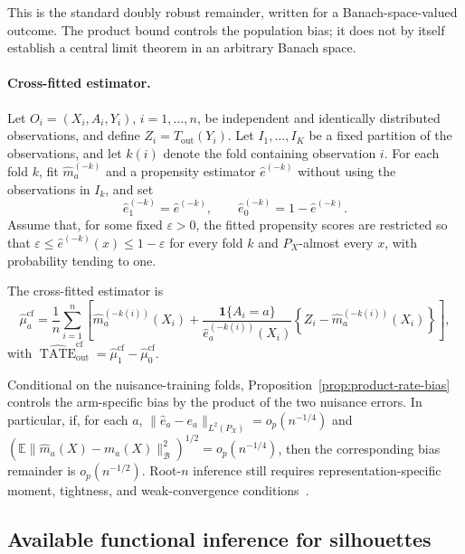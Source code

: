 \documentclass[11pt,a4paper]{article}
\theoremstyle{plain}
\theoremstyle{definition}
\theoremstyle{remark}
\newcommand{\1}{\mathbbm{1}}
\begin{document}
This is the standard doubly robust remainder, written for a
Banach-space-valued outcome. The product bound controls the population bias; it does not by itself establish a central limit theorem in an arbitrary Banach space.

\paragraph{Cross-fitted estimator.}
\label{subsec:sample-estimator-outcome}

Let \(O_i=(X_i,A_i,Y_i)\), \(i=1,\ldots,n\), be independent and identically distributed observations, and define
\(Z_i=T_{\mathrm{out}}(Y_i)\). Let \(I_1,\ldots,I_K\) be a fixed partition of the observations, and let \(k(i)\) denote the fold containing observation \(i\). For each fold \(k\), fit \(\widehat m_a^{(-k)}\) and a propensity estimator
\(\widehat e^{(-k)}\) without using the observations in \(I_k\), and set
\[
\widehat e_1^{(-k)}=\widehat e^{(-k)},
\qquad
\widehat e_0^{(-k)}=1-\widehat e^{(-k)}.
\]
Assume that, for some fixed \(\varepsilon>0\), the fitted propensity scores are restricted so that
\(\varepsilon \leq \widehat e^{(-k)}(x)
\leq 1-\varepsilon\) for every fold \(k\) and \(P_X\)-almost every \(x\), with probability tending to one.

The cross-fitted estimator is
\[
\widehat\mu_a^{\mathrm{cf}}
=
\frac1n\sum_{i=1}^n
\left[
\widehat m_a^{(-k(i))}(X_i)
+
\frac{\mathbf 1\{A_i=a\}}
     {\widehat e_a^{(-k(i))}(X_i)}
\left\{
Z_i-\widehat m_a^{(-k(i))}(X_i)
\right\}
\right],
\]
with
\(\widehat{\operatorname{TATE}}_{\mathrm{out}}^{\mathrm{cf}}
= \widehat\mu_1^{\mathrm{cf}} - \widehat\mu_0^{\mathrm{cf}}\).

Conditional on the nuisance-training folds, Proposition~\ref{prop:product-rate-bias} controls the arm-specific bias by the product of the two nuisance errors. In particular, if, for each \(a\),
\(\|\widehat e_a-e_a\|_{L^2(P_X)} = o_p(n^{-1/4})\) and
\(\left( \mathbb E\| \widehat m_a(X)-m_a(X)
\|_{\mathcal B}^2 \right)^{1/2} = o_p(n^{-1/4})\), then the corresponding bias remainder is \(o_p(n^{-1/2})\). Root-\(n\) inference still requires representation-specific moment, tightness, and weak-convergence conditions~\citep{chernozhukov2018,kennedy2022}.

\subsection{Available functional inference for silhouettes}
\label{subsec:inference}
\end{document}
